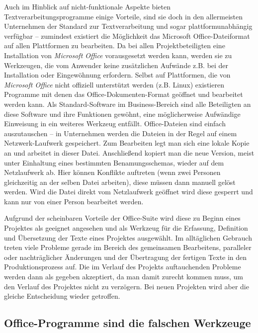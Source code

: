Auch im Hinblick auf nicht-funktionale Aspekte bieten Textverarbeitungsprogramme einige Vorteile, sind sie doch in den allermeisten Unternehmen der Standard zur Textverarbeitung und sogar plattformunabhängig verfügbar – zumindest existiert die Möglichkeit das Microsoft Office-Dateiformat auf allen Plattformen zu bearbeiten. Da bei allen Projektbeteiligten eine Installation von \emph{Microsoft Office} vorausgesetzt werden kann, werden sie zu  Werkzeugen, die vom Anwender keine zusätzlichen Aufwände z.B. bei der Installation oder Eingewöhnung erfordern. Selbst auf Plattformen, die von \emph{Microsoft Office} nicht offiziell unterstützt werden (z.B. Linux) existieren Programme mit denen das Office-Dokumenten-Format geöffnet und bearbeitet werden kann. Als Standard-Software im Business-Bereich sind alle Beteiligten an diese Software und ihre Funktionen gewöhnt, eine möglicherweise Aufwändige Einweisung in ein weiteres Werkzeug entfällt. Office-Dateien sind einfach auszutauschen – in Unternehmen werden die Dateien in der Regel auf einem Netzwerk-Laufwerk gespeichert. Zum Bearbeiten legt man sich eine lokale Kopie an und arbeitet in dieser Datei. Anschließend kopiert man die neue Version, meist unter Einhaltung eines bestimmten Benamungsschemas, wieder auf dem Netzlaufwerk ab. Hier können Konflikte auftreten (wenn zwei Personen gleichzeitig an der selben Datei arbeiten), diese müssen dann manuell gelöst werden. Wird die Datei direkt vom Netzlaufwerk geöffnet wird diese gesperrt und kann nur von einer Person bearbeitet werden.

Aufgrund der scheinbaren Vorteile der Office-Suite wird diese zu Beginn eines Projektes als geeignet angesehen und als Werkzeug für die Erfassung, Definition und Übersetzung der Texte eines Projektes ausgewählt. Im alltäglichen Gebrauch treten viele Probleme gerade im Bereich des gemeinsamen Bearbeitens, paralleler oder nachträglicher Änderungen und der Übertragung der fertigen Texte in den Produktionsprozess auf. Die im Verlauf des Projekts auftauchenden Probleme werden dann als gegeben akzeptiert, da man  damit zurecht kommen muss, um den Verlauf des Projektes nicht zu verzögern. Bei neuen Projekten wird aber die gleiche Entscheidung wieder getroffen.


\subsection{Office-Programme sind die falschen Werkzeuge}

